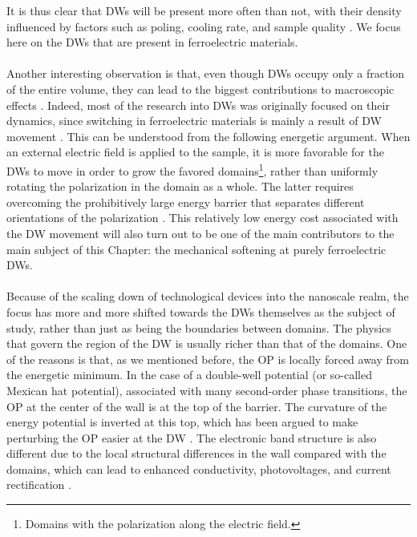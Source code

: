 It is thus clear that DWs will be present more often than not, with their density influenced by factors such as poling, cooling rate, and sample quality \cite{Griffin2012,Shen2018,Nataf2020}.
We focus here on the DWs that are present in ferroelectric materials.
\\\\
Another interesting observation is that, even though DWs occupy only a fraction of the entire volume, they can lead to the biggest contributions to macroscopic effects \cite{Schranz2012}. 
Indeed, most of the research into DWs was originally focused on their dynamics, since switching in ferroelectric materials is mainly a result of DW movement \cite{Merz1954,Gao2013}.
This can be understood from the following energetic argument.
When an external electric field is applied to the sample, it is more favorable for the DWs to move in order to grow the favored domains\footnote{Domains with the polarization along the electric field.}, rather than uniformly rotating the polarization in the domain as a whole.
The latter requires overcoming the prohibitively large energy barrier that separates different orientations of the polarization \cite{Tagantsev2010}.
This relatively low energy cost associated with the DW movement will also turn out to be one of the main contributors to the main subject of this Chapter: the mechanical softening at purely ferroelectric DWs.
\\\\
Because of the scaling down of technological devices into the nanoscale realm, the focus has more and more shifted towards the DWs themselves as the subject of study, rather than just as being the boundaries between domains.
The physics that govern the region of the DW is usually richer than that of the domains. One of the reasons is that, as we mentioned before, the OP is locally forced away from the energetic minimum.
In the case of a double-well potential (or so-called Mexican hat potential), associated with many second-order phase transitions, the OP at the center of the wall is at the top of the barrier.
The curvature of the energy potential is inverted at this top, which has been argued to make perturbing the OP easier at the DW \cite{Scott2012}.
The electronic band structure is also different due to the local structural differences in the wall compared with the domains, which can lead to enhanced conductivity, photovoltages, and current rectification \cite{Inoue2015,Korbel2018,Korbel2020,Huyan2019}.

